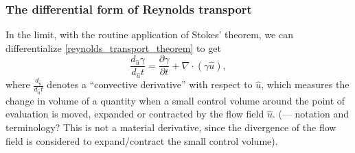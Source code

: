 \documentclass[11pt,a4paper]{memoir}
\newcommand{\Part}[2]{\frac{\partial #1}{\partial #2}}
\begin{document}
\subsubsection{The differential form of Reynolds transport}
 In the limit, with the routine application of Stokes' theorem, we can differentialize \eqref{reynolds_transport_theorem}
to get
\begin{equation}\label{reynolds_transport_theorem_differential}
    \frac{d_{\hat{u}}\gamma}{d_{\hat{u}}t} = \Part{\gamma}{t} + \nabla \cdot(\gamma \hat{u}),
\end{equation}
where $\frac{d_{\hat{u}}}{d_{\hat{u}}t}$ denotes a ``convective derivative'' with respect to $\hat{u}$, which measures
the change in volume of a quantity when a small control volume around the point of evaluation is moved, expanded or contracted by the flow field $\hat{u}$. (--- notation and terminology? This is not a material derivative, since the divergence of the flow field is considered to expand/contract the small control volume).
\end{document}
